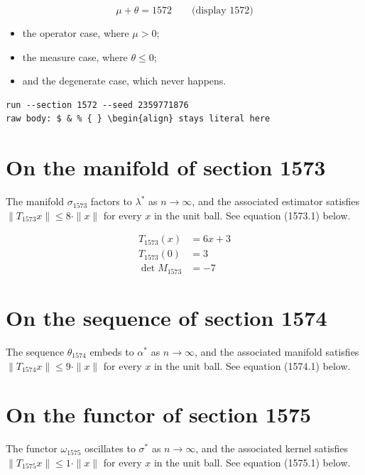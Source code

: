 \documentclass{article}
\begin{document}
$$
\mu + \theta = 1572 \qquad \text{(display 1572)}
$$

\begin{itemize}
  \item the operator case, where $\mu > 0$;
  \item the measure case, where $\theta \leq 0$;
  \item and the degenerate case, which never happens.
\end{itemize}

\begin{verbatim}
run --section 1572 --seed 2359771876
raw body: $ & % { } \begin{align} stays literal here
\end{verbatim}

\section{On the manifold of section 1573}
The manifold $\sigma_{1573}$ factors to $\lambda^{*}$ as $n \to \infty$,
and the associated estimator satisfies $\|T_{1573} x\| \leq 8 \cdot \|x\|$
for every $x$ in the unit ball. See equation (1573.1) below.

\begin{align}
T_{1573}(x) &= 6 x + 3 \\
T_{1573}(0) &= 3 \\
\det M_{1573} &= -7
\end{align}

\section{On the sequence of section 1574}
The sequence $\theta_{1574}$ embeds to $\alpha^{*}$ as $n \to \infty$,
and the associated manifold satisfies $\|T_{1574} x\| \leq 9 \cdot \|x\|$
for every $x$ in the unit ball. See equation (1574.1) below.

\section{On the functor of section 1575}
The functor $\omega_{1575}$ oscillates to $\sigma^{*}$ as $n \to \infty$,
and the associated kernel satisfies $\|T_{1575} x\| \leq 1 \cdot \|x\|$
for every $x$ in the unit ball. See equation (1575.1) below.
\end{document}
